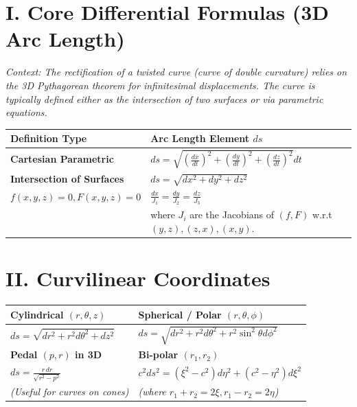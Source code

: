 \documentclass[11pt, a4paper]{article}
\begin{document}
\section*{\color{primary} I. Core Differential Formulas (3D Arc Length)}

\textit{\small Context: The rectification of a twisted curve (curve of double curvature) relies on the 3D Pythagorean theorem for infinitesimal displacements. The curve is typically defined either as the intersection of two surfaces or via parametric equations.}

\begin{center}
\begin{tabular}{@{}p{} p{}@{}}
\toprule
\textbf{Definition Type} & \textbf{Arc Length Element $ds$} \\
\midrule
\textbf{Cartesian Parametric} & $ds = \sqrt{\left(\frac{dx}{dt}\right)^2 + \left(\frac{dy}{dt}\right)^2 + \left(\frac{dz}{dt}\right)^2} dt$ \\
\textbf{Intersection of Surfaces} & $ds = \sqrt{dx^2 + dy^2 + dz^2}$ \\
$f(x,y,z)=0, F(x,y,z)=0$ & $\frac{dx}{J_1} = \frac{dy}{J_2} = \frac{dz}{J_3}$ \\
& where $J_i$ are the Jacobians of $(f, F)$ w.r.t $(y,z), (z,x), (x,y)$. \\
\bottomrule
\end{tabular}
\end{center}

\vspace{0.3cm}

\section*{\color{primary} II. Curvilinear Coordinates}

\begin{center}
\begin{tabular}{@{}p{} p{}@{}}
\toprule
\textbf{Cylindrical $(r, \theta, z)$} & \textbf{Spherical / Polar $(r, \theta, \phi)$} \\
\midrule
$ds = \sqrt{dr^2 + r^2 d\theta^2 + dz^2}$ & $ds = \sqrt{dr^2 + r^2 d\theta^2 + r^2 \sin^2\theta d\phi^2}$ \\
\midrule
\textbf{Pedal $(p, r)$ in 3D} & \textbf{Bi-polar $(r_1, r_2)$} \\
\midrule
$ds = \frac{r \, dr}{\sqrt{r^2-p^2}}$ & $c^2 ds^2 = (\xi^2-c^2)d\eta^2 + (c^2-\eta^2)d\xi^2$ \\
\textit{(Useful for curves on cones)} & \textit{(where $r_1+r_2=2\xi, r_1-r_2=2\eta$)} \\
\bottomrule
\end{tabular}
\end{center}
\end{document}
